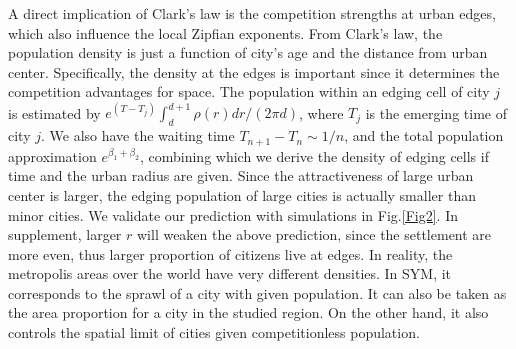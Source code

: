 \documentclass[reprint,unsortedaddress,amsmath,amssymb,aps,prl,showkeys]{revtex4-2}
\begin{document}
A direct implication of Clark's law is the competition strengths at urban edges, which also influence the local Zipfian exponents. From Clark's law, the population density is just a function of city's age and the distance from urban center. Specifically, the density at the edges is important since it determines the competition advantages for space. The population within an edging cell of city $j$ is estimated by $e^{(T-T_j)}\int_{d}^{d+1}\rho(r)dr/(2\pi d)$, where $T_j$ is the emerging time of city $j$. We also have the waiting time $T_{n+1}-T_{n}\sim 1/n$, and the total population approximation $e^{\beta_1+\beta_2}$, combining which we derive the density of edging cells if time and the urban radius are given. Since the attractiveness of large urban center is larger, the edging population of large cities is actually smaller than minor cities. We validate our prediction with simulations in Fig.\@\ref{Fig2}. %
In supplement, larger $r$ will weaken the above prediction, since the settlement are more even, thus larger proportion of citizens live at edges. In reality, the metropolis areas over the world have very different densities. In SYM, it corresponds to the sprawl of a city with given population. It can also be taken as the area proportion for a city in the studied region. On the other hand, it also controls the spatial limit of cities given competitionless population.
\end{document}
